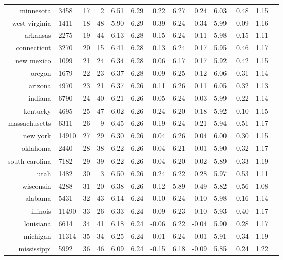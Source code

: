 \documentclass{llncs}
\begin{document}
\begin{landscape}
\begin{table}
\begin{tabular}{rlrrrrrrrrrrr}
    minnesota & 3458 &  17 &   2 & 6.51 & 6.29 & 0.22 & 6.27 & 0.24 & 6.03 & 0.48 & 1.15 \\
    west virginia & 1411 &  18 &  48 & 5.90 & 6.29 & -0.39 & 6.24 & -0.34 & 5.99 & -0.09 & 1.16 \\
    arkansas & 2275 &  19 &  44 & 6.13 & 6.28 & -0.15 & 6.24 & -0.11 & 5.98 & 0.15 & 1.11 \\
    connecticut & 3270 &  20 &  15 & 6.41 & 6.28 & 0.13 & 6.24 & 0.17 & 5.95 & 0.46 & 1.17 \\
    new mexico & 1099 &  21 &  24 & 6.34 & 6.28 & 0.06 & 6.17 & 0.17 & 5.92 & 0.42 & 1.15 \\
    oregon & 1679 &  22 &  23 & 6.37 & 6.28 & 0.09 & 6.25 & 0.12 & 6.06 & 0.31 & 1.14 \\
    arizona & 4970 &  23 &  21 & 6.37 & 6.26 & 0.11 & 6.26 & 0.11 & 6.05 & 0.32 & 1.13 \\
    indiana & 6790 &  24 &  40 & 6.21 & 6.26 & -0.05 & 6.24 & -0.03 & 5.99 & 0.22 & 1.14 \\
    kentucky & 4695 &  25 &  47 & 6.02 & 6.26 & -0.24 & 6.20 & -0.18 & 5.92 & 0.10 & 1.15 \\
    massachusetts & 6311 &  26 &   9 & 6.45 & 6.26 & 0.19 & 6.24 & 0.21 & 5.94 & 0.51 & 1.17 \\
    new york & 14910 &  27 &  29 & 6.30 & 6.26 & 0.04 & 6.26 & 0.04 & 6.00 & 0.30 & 1.15 \\
    oklahoma & 2440 &  28 &  38 & 6.22 & 6.26 & -0.04 & 6.21 & 0.01 & 5.90 & 0.32 & 1.17 \\
    south carolina & 7182 &  29 &  39 & 6.22 & 6.26 & -0.04 & 6.20 & 0.02 & 5.89 & 0.33 & 1.19 \\
    utah & 1482 &  30 &   3 & 6.50 & 6.26 & 0.24 & 6.22 & 0.28 & 5.97 & 0.53 & 1.11 \\
    wisconsin & 4288 &  31 &  20 & 6.38 & 6.26 & 0.12 & 5.89 & 0.49 & 5.82 & 0.56 & 1.08 \\
    alabama & 5431 &  32 &  43 & 6.14 & 6.24 & -0.10 & 6.24 & -0.10 & 5.98 & 0.16 & 1.14 \\
    illinois & 11490 &  33 &  26 & 6.33 & 6.24 & 0.09 & 6.23 & 0.10 & 5.93 & 0.40 & 1.17 \\
    louisiana & 6614 &  34 &  41 & 6.18 & 6.24 & -0.06 & 6.22 & -0.04 & 5.90 & 0.28 & 1.17 \\
    michigan & 11314 &  35 &  34 & 6.25 & 6.24 & 0.01 & 6.24 & 0.01 & 5.91 & 0.34 & 1.19 \\
    mississippi & 5992 &  36 &  46 & 6.09 & 6.24 & -0.15 & 6.18 & -0.09 & 5.85 & 0.24 & 1.22 \\

\end{tabular}
\end{table}
\end{landscape}
\end{document}
